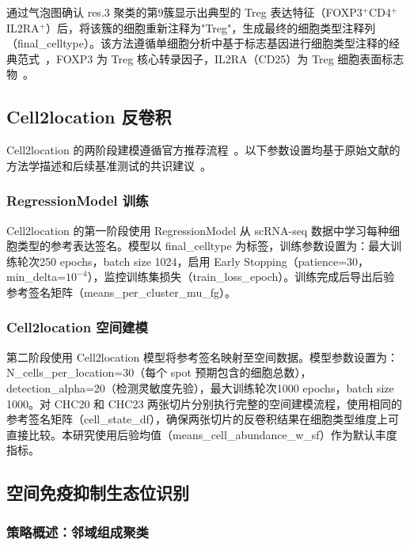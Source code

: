 \documentclass[12pt, a4paper]{ctexart}
\begin{document}
通过气泡图确认 res.3 聚类的第9簇显示出典型的 Treg 表达特征（FOXP3$^+$CD4$^+$IL2RA$^+$）后，将该簇的细胞重新注释为"Treg"，生成最终的细胞类型注释列（final\_celltype）。该方法遵循单细胞分析中基于标志基因进行细胞类型注释的经典范式~\cite{luecken2019current}，FOXP3 为 Treg 核心转录因子，IL2RA（CD25）为 Treg 细胞表面标志物~\cite{sakaguchi2020regulatory}。

\subsection{Cell2location 反卷积}

Cell2location 的两阶段建模遵循官方推荐流程~\cite{kleshchevnikov2022cell2location}。以下参数设置均基于原始文献的方法学描述和后续基准测试的共识建议~\cite{li2022benchmarking, sang2023spotless}。

\subsubsection{RegressionModel 训练}

Cell2location 的第一阶段使用 RegressionModel 从 scRNA-seq 数据中学习每种细胞类型的参考表达签名。模型以 final\_celltype 为标签，训练参数设置为：最大训练轮次250 epochs，batch size 1024，启用 Early Stopping（patience=30，min\_delta=$10^{-4}$），监控训练集损失（train\_loss\_epoch）。训练完成后导出后验参考签名矩阵（means\_per\_cluster\_mu\_fg）。

\subsubsection{Cell2location 空间建模}

第二阶段使用 Cell2location 模型将参考签名映射至空间数据。模型参数设置为：N\_cells\_per\_location=30（每个 spot 预期包含的细胞总数），detection\_alpha=20（检测灵敏度先验），最大训练轮次1000 epochs，batch size 1000。对 CHC20 和 CHC23 两张切片分别执行完整的空间建模流程，使用相同的参考签名矩阵（cell\_state\_df），确保两张切片的反卷积结果在细胞类型维度上可直接比较。本研究使用后验均值（means\_cell\_abundance\_w\_sf）作为默认丰度指标。

\subsection{空间免疫抑制生态位识别}
\label{sec:niche_scoring}

\subsubsection{策略概述：邻域组成聚类}
\end{document}
